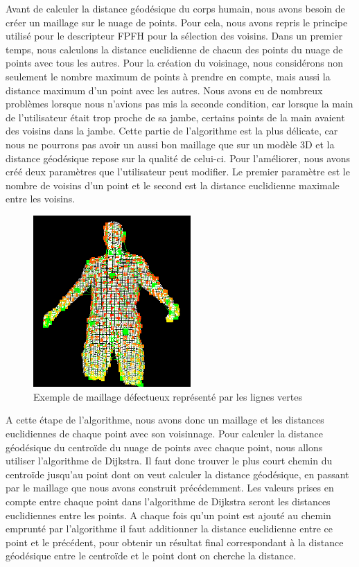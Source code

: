 Avant de calculer la distance géodésique du corps humain, nous avons besoin de créer un maillage sur le nuage de points. Pour cela,
nous avons repris le principe utilisé pour le descripteur FPFH\cite{FPFH} pour la sélection des voisins. Dans un premier temps, nous calculons
la distance euclidienne de chacun des points du nuage de points avec tous les autres. Pour la création du voisinage, nous considérons non
seulement le nombre maximum de points à prendre en compte, mais aussi la distance maximum d'un point avec les autres. Nous avons eu
de nombreux problèmes lorsque nous n'avions pas mis la seconde condition, car lorsque la main de l'utilisateur était trop proche de sa 
jambe, certains points de la main avaient des voisins dans la jambe. Cette partie de l'algorithme est la plus délicate, car nous ne pourrons
pas avoir un aussi bon maillage que sur un modèle 3D et la distance géodésique repose sur la qualité de celui-ci. Pour l'améliorer, nous avons créé deux paramètres que l'utilisateur peut modifier. Le premier paramètre est le nombre de voisins d'un point et
le second est la distance euclidienne maximale entre les voisins.\\

\begin{figure}[!ht]
  \begin{center}
    \includegraphics[width=6cm]{image/maillage.PNG}
    \caption{Exemple de maillage défectueux représenté par les lignes vertes}
    \label{fig:seuillage}
  \end{center}
\end{figure}

A cette étape de l'algorithme, nous avons donc un maillage et les distances euclidiennes de chaque point avec son voisinnage. Pour calculer
la distance géodésique du centroïde du nuage de points avec chaque point, nous allons utiliser l'algorithme de Dijkstra\cite{dijkstra}.
Il faut donc trouver le plus court chemin du centroïde jusqu'au point dont on veut calculer la distance géodésique, en passant par le
maillage que nous avons construit précédemment. Les valeurs prises en compte entre chaque point dans l'algorithme de Dijkstra seront
les distances euclidiennes entre les points. A chaque fois qu'un point est ajouté au chemin emprunté par l'algorithme il faut 
additionner la distance euclidienne entre ce point et le précédent, pour obtenir un résultat final correspondant à la distance 
géodésique entre le centroïde et le point dont on cherche la distance.\\

